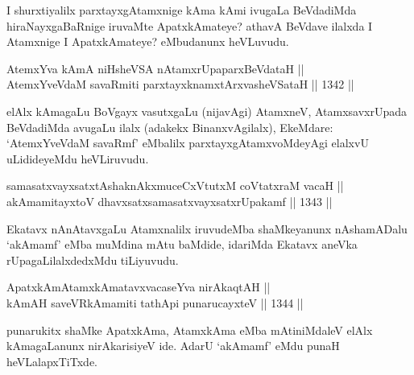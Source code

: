 \begin{artha}
I shurxtiyalilx parxtayxgAtamxnige kAma kAmi ivugaLa BeVdadiMda hiraNayxgaBaRnige iruvaMte ApatxkAmateye? athavA BeVdave ilalxda I Atamxnige I ApatxkAmateye? eMbudanunx heVLuvudu.
\end{artha}

\begin{shl}
\footnotemark[1]AtemxYva kAmA niHsheVSA nA\s \s tamxrUpaparxBeVdataH || \\
AtemxYveVdaM savaRmiti parxtayxknamxtArxvasheVSataH \hfill || 1342 ||  
\end{shl}

\begin{artha}
elAlx kAmagaLu BoVgayx vasutxgaLu (nijavAgi) AtamxneV, AtamxsavxrUpada BeVdadiMda avugaLu ilalx (adakekx BinanxvAgilalx), EkeMdare: `AtemxYveVdaM savaRmf' eMbalilx parxtayxgAtamxvoMdeyAgi elalxvU uLidideyeMdu heVLiruvudu.
\end{artha}


\begin{shl}
samasatxvayxsatxtAshaknAkxmuceCxVtutxM coVtatxraM vacaH || \\
\footnotemark[2]akAmamitayxtoV dhavxsatxsamasatxvayxsatxrUpakamf \hfill || 1343 ||  
\end{shl}

\begin{artha}
Ekatavx nAnAtavxgaLu Atamxnalilx iruvudeMba shaMkeyanunx nAshamADalu `akAmamf' eMba muMdina mAtu baMdide, idariMda Ekatavx aneVka rUpagaLilalxdedxMdu tiLiyuvudu.
\end{artha}

\begin{shl}
ApatxkAmAtamxkAmatavxvacaseYva nirAkaqtAH || \\
kAmAH saveVR\s kAmamiti tathA\s pi punarucayxteV \hfill || 1344 ||  
\end{shl}

\begin{artha}
punarukitx shaMke ApatxkAma, AtamxkAma eMba mAtiniMdaleV elAlx kAmagaLanunx nirAkarisiyeV ide. AdarU `akAmamf' eMdu punaH heVLalapxTiTxde.
\end{artha}

